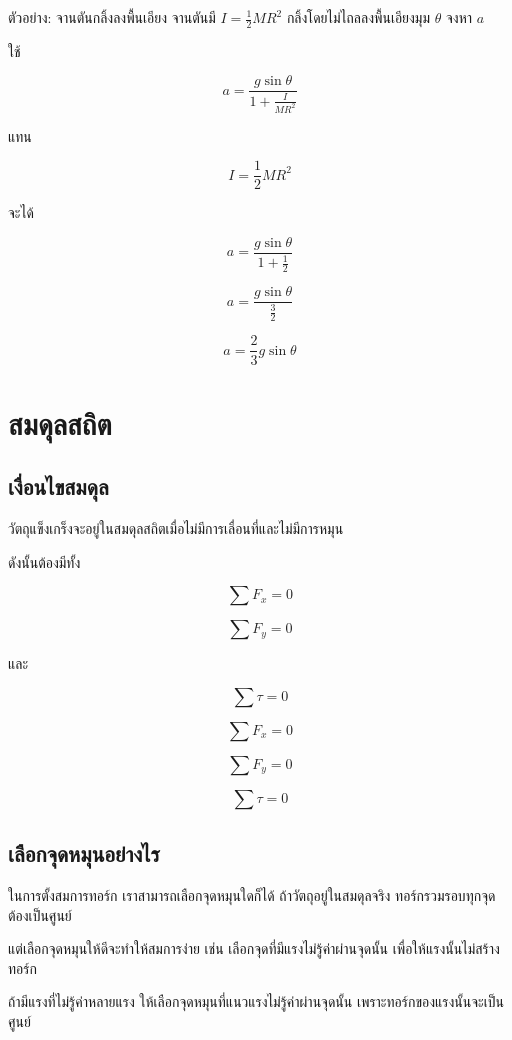 \begin{examplebox}{ตัวอย่าง: จานตันกลิ้งลงพื้นเอียง}
จานตันมี $I=\frac{1}{2}MR^2$ กลิ้งโดยไม่ไถลลงพื้นเอียงมุม $\theta$ จงหา $a$

ใช้

\[
a=\frac{g\sin\theta}{1+\frac{I}{MR^2}}
\]

แทน

\[
I=\frac{1}{2}MR^2
\]

จะได้

\[
a=\frac{g\sin\theta}{1+\frac{1}{2}}
\]

\[
a=\frac{g\sin\theta}{\frac{3}{2}}
\]

\[
\boxed{a=\frac{2}{3}g\sin\theta}
\]
\end{examplebox}

\section{สมดุลสถิต}

\subsection{เงื่อนไขสมดุล}

วัตถุแข็งเกร็งจะอยู่ในสมดุลสถิตเมื่อไม่มีการเลื่อนที่และไม่มีการหมุน

ดังนั้นต้องมีทั้ง

\[
\sum F_x=0
\]

\[
\sum F_y=0
\]

และ

\[
\sum \tau=0
\]

\begin{tcolorbox}[title=เงื่อนไขสมดุลสถิต]
\[
\sum F_x=0
\]

\[
\sum F_y=0
\]

\[
\sum \tau=0
\]
\end{tcolorbox}

\subsection{เลือกจุดหมุนอย่างไร}

ในการตั้งสมการทอร์ก เราสามารถเลือกจุดหมุนใดก็ได้ ถ้าวัตถุอยู่ในสมดุลจริง ทอร์กรวมรอบทุกจุดต้องเป็นศูนย์

แต่เลือกจุดหมุนให้ดีจะทำให้สมการง่าย เช่น เลือกจุดที่มีแรงไม่รู้ค่าผ่านจุดนั้น เพื่อให้แรงนั้นไม่สร้างทอร์ก

\begin{tcolorbox}[title=เทคนิคเลือกจุดหมุน]
ถ้ามีแรงที่ไม่รู้ค่าหลายแรง ให้เลือกจุดหมุนที่แนวแรงไม่รู้ค่าผ่านจุดนั้น เพราะทอร์กของแรงนั้นจะเป็นศูนย์
\end{tcolorbox}

